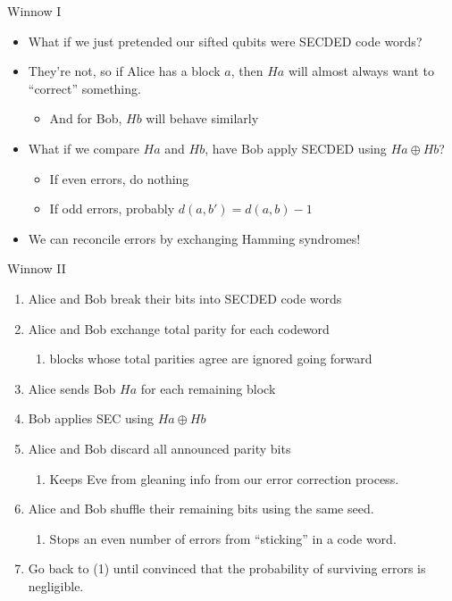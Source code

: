 \documentclass[pdf]{beamer}
\begin{document}
\begin{frame}{Winnow I}
  \begin{itemize}
  \item What if we just pretended our sifted qubits were SECDED code words?
  \item They're not, so if Alice has a block $a$, then $Ha$ will almost always
    want to ``correct'' something.
    \begin{itemize}
    \item And for Bob, $Hb$ will behave similarly
    \end{itemize}
  \item What if we compare $Ha$ and $Hb$, have Bob apply SECDED using
    $Ha \oplus Hb$?
    \begin{itemize}
    \item If even errors, do nothing
    \item If odd errors, probably $d(a, b') = d(a, b) - 1$
    \end{itemize}
  \item We can reconcile errors by exchanging Hamming syndromes!
  \end{itemize}
\end{frame}
\begin{frame}{Winnow II}
  \begin{enumerate}
  \item Alice and Bob break their bits into SECDED code words
  \item Alice and Bob exchange total parity for each codeword
    \begin{enumerate}
    \item blocks whose total parities agree are ignored going forward
    \end{enumerate}
  \item Alice sends Bob $Ha$ for each remaining block
  \item Bob applies SEC using $Ha \oplus Hb$
  \item Alice and Bob discard all announced parity bits
    \begin{enumerate}
    \item Keeps Eve from gleaning info from our error correction process.
    \end{enumerate}
  \item Alice and Bob shuffle their remaining bits using the same seed.
    \begin{enumerate}
    \item Stops an even number of errors from ``sticking'' in a code word.
    \end{enumerate}
  \item Go back to (1) until convinced that the probability of surviving errors
    is negligible.
  \end{enumerate}
\end{frame}
\end{document}
